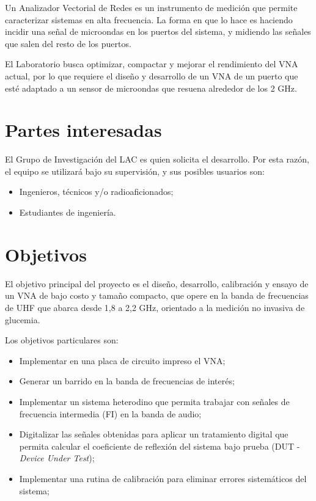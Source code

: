Un Analizador Vectorial de Redes es un instrumento de medición que permite caracterizar sistemas en alta frecuencia. La forma en que lo hace es haciendo incidir una señal de microondas en los puertos del sistema, y midiendo las señales que salen del resto de los puertos.

El Laboratorio busca optimizar, compactar y mejorar el rendimiento del VNA actual, por lo que requiere el diseño y desarrollo de un VNA de un puerto que esté adaptado a un sensor de microondas que resuena alrededor de los 2 GHz.

 \section{Partes interesadas}
El Grupo de Investigación del LAC es quien solicita el desarrollo. Por esta razón, el equipo se utilizará bajo su supervisión, y sus posibles usuarios son:
\begin{itemize}
    \item Ingenieros, técnicos y/o radioaficionados;
    \item Estudiantes de ingeniería.
\end{itemize}



\section{Objetivos}
El objetivo principal del proyecto es el diseño, desarrollo, calibración y ensayo de un VNA de bajo costo y tamaño compacto, que opere en la banda de frecuencias de UHF que abarca desde 1,8 a 2,2 GHz, orientado a la medición no invasiva de glucemia.
\vspace{\baselineskip}

Los objetivos particulares son:
\begin{itemize}
    \item Implementar en una placa de circuito impreso el VNA;
    \item Generar un barrido en la banda de frecuencias de interés;
    \item Implementar un sistema heterodino que permita trabajar con señales de frecuencia intermedia (FI) en la banda de audio;
    \item Digitalizar las señales obtenidas para aplicar un tratamiento digital que permita calcular el coeficiente de reflexión del sistema bajo prueba (DUT - \textit{Device Under Test});
    \item Implementar una rutina de calibración para eliminar errores sistemáticos del sistema;
    
\end{itemize}

